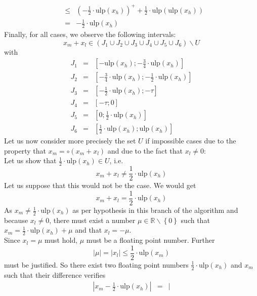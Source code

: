 \documentclass[a4paper,10pt,twoside]{article}
\newenvironment{proof}[1][Proof]{\begin{trivlist}
\item[\hskip \labelsep {\bfseries #1}]}{\end{trivlist}}
\newcommand{\R}{\ensuremath{\mathbb {R}}}
\newcommand{\hi}{\ensuremath{\mathit{h}}}
\newcommand{\mi}{\ensuremath{\mathit{m}}}
\newcommand{\lo}{\ensuremath{\mathit{l}}}
\newcommand{\mUlp}{\ensuremath{\mathrm{ulp}}}
\begin{document}
\begin{proof}
\begin{eqnarray*}
& \leq & \left(- \frac{1}{2} \cdot  \mUlp\left( x_\hi \right) \right)^+ + \frac{1}{2} \cdot \mUlp\left(  \mUlp\left( x_\hi \right)  \right) \\
& = & -\frac{1}{2} \cdot  \mUlp\left( x_\hi \right) 
\end{eqnarray*}
Finally, for all cases, we observe the following intervals:
$$x_\mi + x_\lo \in \left( J_1 \cup J_2 \cup J_3 \cup J_4 \cup J_5 \cup J_6 \right) \backslash U$$
with
\begin{eqnarray*}
J_1 & = & \left[ - \mUlp\left( x_\hi \right) ; - \frac{3}{4} \cdot \mUlp\left( x_\hi \right) \right] \\
J_2 & = & \left[ - \frac{3}{4} \cdot \mUlp\left( x_\hi \right) ; - \frac{1}{2} \cdot \mUlp\left( x_\hi \right) \right] \\
J_3 & = & \left[ - \frac{1}{2} \cdot \mUlp\left( x_\hi \right) ; - \tau \right] \\
J_4 & = & \left[ - \tau ; 0 \right] \\
J_5 & = & \left[ 0 ; \frac{1}{2} \cdot \mUlp\left( x_\hi \right) \right] \\
J_6 & = & \left[ \frac{1}{2} \cdot \mUlp\left( x_\hi \right) ; \mUlp\left( x_\hi \right) \right] 
\end{eqnarray*}
Let us now consider more precisely the set $U$ if impossible cases due to the property that
$x_\mi = \circ \left( x_\mi + x_\lo \right)$ and due to the fact that $x_\lo \not = 0$: \\
Let us show that $\frac{1}{2} \cdot \mUlp\left( x_\hi \right) \in U$, i.e. 
$$x_\mi + x_\lo \not = \frac{1}{2} \cdot \mUlp\left( x_\hi \right)$$
Let us suppose that this would not be the case. We would get
$$x_\mi + x_\lo = \frac{1}{2} \cdot \mUlp\left( x_\hi \right)$$
As $x_\mi \not = \frac{1}{2} \cdot \mUlp\left( x_\hi \right)$ as per hypothesis in this branch of the algorithm and because 
$x_\lo \not = 0$, there must exist a number $\mu \in \R \backslash \left \lbrace 0 \right \rbrace$ such that
$x_\mi = \frac{1}{2} \cdot \mUlp\left( x_\hi \right) + \mu$ and that $x_\lo = -\mu$. \\
Since $x_\lo = \mu$  must hold, $\mu$ must be a floating point number. 
Further $$\left \vert \mu \right \vert = \left \vert x_\lo \right \vert \leq \frac{1}{2} \cdot \mUlp\left( x_\mi \right)$$
must be justified.
So there exist two floating point numbers $\frac{1}{2} \cdot \mUlp\left( x_\hi \right)$ and $x_\mi$ such that 
their difference verifies
\begin{eqnarray*}
\left \vert x_\mi - \frac{1}{2} \cdot \mUlp\left( x_\hi \right) \right \vert & = & \left \vert 

\end{eqnarray*}
\end{proof}
\end{document}
